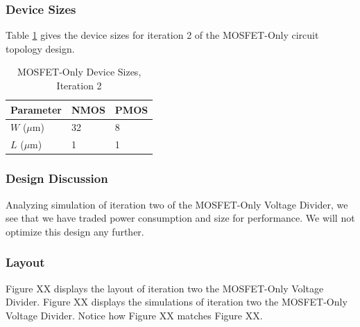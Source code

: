 \documentclass[conference]{IEEEtran}
\begin{document}
\subsubsection{Device Sizes}
Table \ref{tab:mo-ds-2} gives the device sizes for iteration 2 of the MOSFET-Only circuit topology design.
\begin{table}[!htbp]
  \caption[]{MOSFET-Only Device Sizes, Iteration 2}
  \label{tab:mo-ds-2}
  \centering
  \begin{tabular}{|l|l|l|}
    \hline
    Parameter			& NMOS	&PMOS \\ \hline
    $W$ ($\mu$m)		&32		&8\\ 
    $L$ ($\mu$m)		& 1		&1\\
    \hline
  \end{tabular}
\end{table}
\subsubsection{Design Discussion}
Analyzing simulation of iteration two of the MOSFET-Only Voltage Divider, we see that we have traded power consumption and size for performance.  We will not optimize this design any further.\\
\subsubsection{Layout}
Figure XX displays the layout of iteration two the MOSFET-Only Voltage Divider.  Figure XX displays the simulations of iteration two the MOSFET-Only Voltage Divider.  Notice how Figure XX matches Figure XX.

\end{document}

